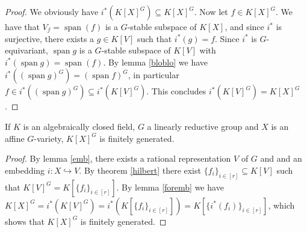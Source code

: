\begin{proof}
  We obviously have $i^\ast(K[X]^G) \subseteq K[X]^G$.
  Now let $f \in K[X]^G$.
  We have that $V_f = \operatorname{span}(f)$ is a $G$-stable subspace of $K[X]$, and since $i^\ast$ is surjective, there exists a $g\in K[V]$ such that $i^\ast(g) = f$.
  Since $i^\ast$ is $G$-equivariant, $\operatorname{span}g$ is a $G$-stable subspace of $K[V]$ with $i^\ast(\operatorname{span}g) = \operatorname{span}(f)$.
  By lemma \ref{bloblo} we have $i^\ast ((\operatorname{span}g)^G) = (\operatorname{span}f)^G$, in particular $f \in i^\ast ((\operatorname{span}g)^G) \subseteq i^\ast(K[V]^G)$.
  This concludes $i^\ast(K[V]^G) = K[X]^G$.
\end{proof}

\begin{theorem}
  If $K$ is an algebraically closed field, $G$ a linearly reductive group and $X$ is an affine $G$-variety, $K[X]^G$ is finitely generated.
\end{theorem}

\begin{proof}
  By lemma \ref{emb}, there exists a rational representation $V$ of $G$ and and an embedding $i \colon X \hookrightarrow V$.
  By theorem \ref{hilbert} there exist $ \{f_i\}_{i \in [r]} \subseteq K[V]$ such that $K[V]^G = K[\{f_i\}_{i \in [r]}]$.
  By lemma \ref{foremb} we have $K[X]^G = i^\ast (K[V]^G) = i^\ast (K[\{f_i\}_{i \in [r]}]) = K[\{i^\ast(f_i)\}_{i \in [r]}]$, which shows that $K[X]^G$ is finitely generated.
\end{proof}

